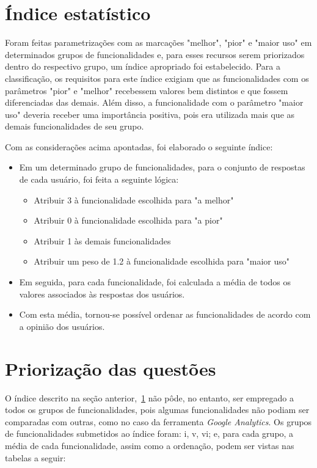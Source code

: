 
\section{Índice estatístico}
\label{sec:indice}

    Foram feitas parametrizações com as marcações "melhor", "pior" e "maior uso" em determinados grupos de funcionalidades e, para esses recursos serem priorizados dentro do respectivo grupo, um índice apropriado foi estabelecido. Para a classificação, os requisitos para este índice exigiam que as funcionalidades com os parâmetros "pior" e "melhor" recebessem valores bem distintos e que fossem diferenciadas das demais. Além disso, a funcionalidade com o parâmetro "maior uso" deveria receber uma importância positiva, pois era utilizada mais que as demais funcionalidades de seu grupo.
    
    Com as considerações acima apontadas, foi elaborado o seguinte índice:
    \begin{itemize}
    \item 
    Em um determinado grupo de funcionalidades, para o conjunto de respostas de cada usuário, foi feita a seguinte lógica:
    
        \begin{itemize}
        \item  
        Atribuir 3 à funcionalidade escolhida para "a melhor"
        \item
        Atribuir 0 à funcionalidade escolhida para "a pior"
        \item
        Atribuir 1 às demais funcionalidades
        \item
        Atribuir um peso de 1.2 à funcionalidade escolhida para "maior uso"
        \end{itemize}
    \item 
    Em seguida, para cada funcionalidade, foi calculada a média de todos os valores associados às respostas dos usuários.
    \item 
    Com esta média, tornou-se possível ordenar as funcionalidades de acordo com a opinião dos usuários.
    \end{itemize}
    
    
\section{Priorização das questões}
\label{sec:priorizacao}

    O índice descrito na seção anterior,~\ref{sec:indice} não pôde, no entanto, ser empregado a todos os grupos de funcionalidades, pois algumas funcionalidades não podiam ser comparadas com outras, como no caso da ferramenta \emph{Google Analytics}. Os grupos de funcionalidades submetidos ao índice foram: i, v, vi; e, para cada grupo, a média de cada funcionalidade, assim como a ordenação, podem ser vistas nas tabelas a seguir:

